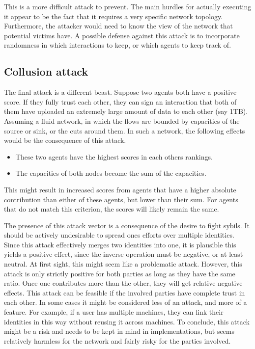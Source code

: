 \documentclass[a4paper,11pt]{book}
\theoremstyle{definition}
\begin{document}
This is a more difficult attack to prevent. The main hurdles for actually executing it appear to be
the fact that it requires a very specific network topology. Furthermore, the attacker would need to
know the view of the network that potential victims have. A possible defense against this attack is
to incorporate randomness in which interactions to keep, or which agents to keep track of.

\subsection{Collusion attack}

The final attack is a different beast. Suppose two agents both have a positive score. If they 
fully trust each other, they can sign an interaction that both of them have uploaded an extremely large
amount of data to each other (say 1TB). Assuming a fluid network,
in which the flows are bounded by capacities of the source or sink, or the cuts around them.
In such a network, the following effects would be the consequence of this attack.

\begin{itemize}
    \item These two agents have the highest scores in each others rankings. 
    \item The capacities of both nodes become the sum of the capacities.
\end{itemize}

This might result in increased scores from agents that have a higher absolute contribution
than either of these agents, but lower than their sum. For agents that do not match this
criterion, the scores will likely remain the same.

The presence of this attack vector is a consequence of the desire to fight sybils. It should be
actively undesirable to spread ones efforts over multiple identities. Since this attack 
effectively merges two identities into one, it is plausible this yields a positive effect,
since the inverse operation must be negative, or at least neutral. At first sight, this
might seem like a problematic attack. However, this attack is only strictly positive for both parties as long
as they have the same ratio. Once one contributes more than the other, they will get relative negative
effects. This attack can be feasible if the involved parties have complete trust in each other. In some
cases it might be considered less of an attack, and more of a feature. For example, if a user
has multiple machines, they can link their identities in this way without reusing it across machines.
To conclude, this attack might be a risk and needs to be kept in mind in implementations, but seems relatively
harmless for the network and fairly risky for the parties involved.
\end{document}
